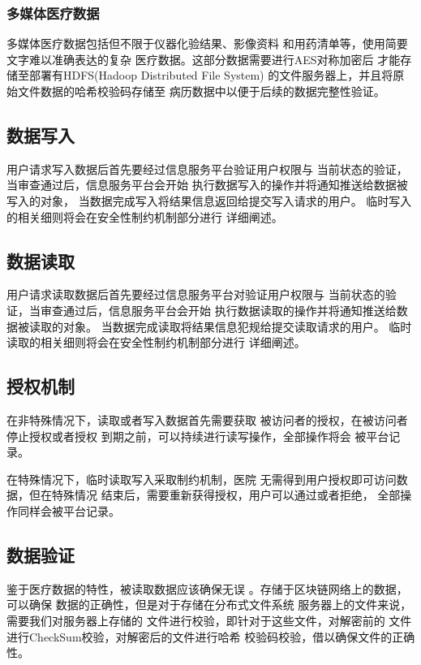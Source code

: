 \documentclass[UTF8]{ctexart}
\begin{document}
    \subsubsection{多媒体医疗数据}
    \par
    多媒体医疗数据包括但不限于仪器化验结果、影像资料
    和用药清单等，使用简要文字难以准确表达的复杂
    医疗数据。这部分数据需要进行AES对称加密后
    才能存储至部署有HDFS(Hadoop Distributed File System)
    的文件服务器上，并且将原始文件数据的哈希校验码存储至
    病历数据中以便于后续的数据完整性验证。
    \subsection{数据写入}
    \par
    用户请求写入数据后首先要经过信息服务平台验证用户权限与
    当前状态的验证，当审查通过后，信息服务平台会开始
    执行数据写入的操作并将通知推送给数据被写入的对象，
    当数据完成写入将结果信息返回给提交写入请求的用户。
    临时写入的相关细则将会在安全性制约机制部分进行
    详细阐述。
    \subsection{数据读取}
    \par
    用户请求读取数据后首先要经过信息服务平台对验证用户权限与
    当前状态的验证，当审查通过后，信息服务平台会开始
    执行数据读取的操作并将通知推送给数据被读取的对象。
    当数据完成读取将结果信息犯规给提交读取请求的用户。
    临时读取的相关细则将会在安全性制约机制部分进行
    详细阐述。
    \subsection{授权机制}
    \par
    在非特殊情况下，读取或者写入数据首先需要获取
    被访问者的授权，在被访问者停止授权或者授权
    到期之前，可以持续进行读写操作，全部操作将会
    被平台记录。
    \par
    在特殊情况下，临时读取写入采取制约机制，医院
    无需得到用户授权即可访问数据，但在特殊情况
    结束后，需要重新获得授权，用户可以通过或者拒绝，
    全部操作同样会被平台记录。
    \subsection{数据验证}
    \par
    鉴于医疗数据的特性，被读取数据应该确保无误
    。存储于区块链网络上的数据，可以确保
    数据的正确性，但是对于存储在分布式文件系统
    服务器上的文件来说，需要我们对服务器上存储的
    文件进行校验，即针对于这些文件，对解密前的
    文件进行CheckSum校验，对解密后的文件进行哈希
    校验码校验，借以确保文件的正确性。
\end{document}
